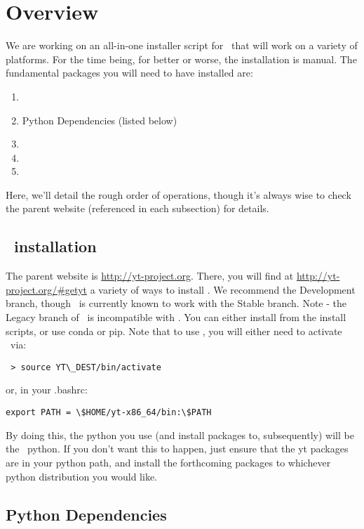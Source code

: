 \section{Overview}

We are working on an all-in-one installer script for \pd \ that will
work on a variety of platforms.  For the time being, for better or
worse, the installation is manual.  The fundamental packages you will
need to have installed are:
\begin{enumerate}
\item \yt 
\item Python Dependencies (listed below)
\item \hyperion
\item \fsps
\item \pfsps
\end{enumerate}

Here, we'll detail the rough order of operations, though it's always
wise to check the parent website (referenced in each subsection) for
details.

\subsection{\yt \ installation}
The parent website is \url{http://yt-project.org}.  There, you will
find at \url{http://yt-project.org/\#getyt} a variety of ways to
install \yt.  We recommend the Development branch, though \pd \ is
currently known to work with the Stable branch.  Note - the Legacy
branch of \yt \ is incompatible with \pd.  You can either install from
the install scripts, or use conda or pip. Note that to use \yt, you
will either need to activate \yt \ via:
\begin{verbatim}
 > source YT\_DEST/bin/activate
\end{verbatim}
or, in your .bashrc:\\
\begin{verbatim}
export PATH = \$HOME/yt-x86_64/bin:\$PATH
\end{verbatim}
By doing this, the python you use (and install packages to,
subsequently) will be the \yt \ python.  If you don't want this to
happen, just ensure that the yt packages are in your python path, and
install the forthcoming packages to whichever python distribution you
would like.



\subsection{Python Dependencies}

